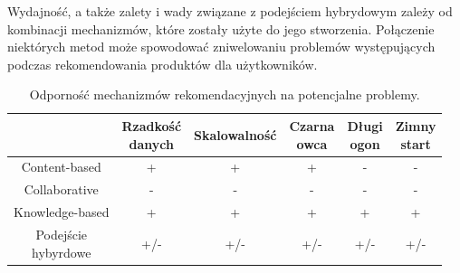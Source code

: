 Wydajność, a także zalety i wady związane z podejściem hybrydowym zależy od kombinacji mechanizmów, które zostały użyte do jego stworzenia. Połączenie niektórych metod może spowodować zniwelowaniu problemów występujących podczas rekomendowania produktów dla użytkowników.

\begin{table}[h]
\centering
\caption{Odporność mechanizmów rekomendacyjnych na potencjalne problemy.}
\begin{tabular}{|c|c|c|c|c|c|}
\hline
&
\specialcell{Rzadkość\\danych} &
Skalowalność &
\specialcell{Czarna\\owca} &
\specialcell{Długi\\ogon} &
\specialcell{Zimny\\start}
\\
\hline
  
Content-based &
+ &
+ &
+ &
- &
-
\\
\hline
  
Collaborative &
- &
- &
- &
- &
-
\\
\hline

Knowledge-based &
+ &
+ &
+ &
+ &
+
\\
\hline

\specialcell{Podejście\\hybyrdowe} &
+/- &
+/- &
+/- &
+/- &
+/-
\\
\hline
\end{tabular} 
\label{tabelaMetProblem}
\end{table}
